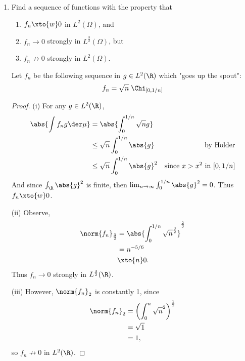 \documentclass[12pt,letterpaper]{article}
\begin{document}
\begin{enumerate}
\begin{proof}
Now considering negative values of $t$; since $f$ is convex, then 
$$f'_-\leq f'_+, $$
and $f'_-$ increases as $t\to 0^-$, so $f(x)+tf'_+(x)\leq f(x)+tf'_-(x)\leq f(x+t)$ for $t<0$, so 
$$f(x)+tf'_+(x)\leq f(x+t)$$
always, and we're done.
\end{proof}

\setcounter{enumi}{22}
\item Find a sequence of functions with the property that 
	\begin{enumerate}
	\item $f_n\xto{w}0$ in $L^2(\Omega)$, and
	\item $f_n\to0$ strongly in $L^\frac{3}{2}(\Omega)$, but 
	\item $f_n\not\to0$ strongly in $L^2(\Omega)$.
	\end{enumerate}
	
	\answer	Let $f_n$ be the following sequence in $g\in L^2(\R)$ which "goes up the spout": 
	$$f_n=\sqrt{n} \;\Chi_{\left[0,{1/n}\right]}$$
	\begin{proof}
	(i) For any $g\in L^2(\R)$, 
	\begin{align*}
	\abs{\int f_ng \der\mu} %
	&=\abs{\int_0^{1/n} \sqrt{n}g } \\
	&\leq \sqrt{n}\int_0^{1/n}\abs{g } & \text{by Holder}\\
	&\leq \sqrt{n}\int_0^{1/n}\abs{g }^2 &\text{since }x>x^2\text{ in }[0,1/n]\\
	\end{align*}
	And since $\int_\R\abs{g}^2$ is finite, then $\lim_{n\to\infty} \int_0^{1/n} \abs{g}^2=0$. 	Thus $f_n\xto{w}0$. \qedwhite

	(ii) Observe, 
	\begin{align*}
	\norm{f_n}_{\frac{3}{2}} &= \abs{\int_0^{1/n} \sqrt{n}^\frac{3}{2} }^{\frac{2}{3}}\\
	&=n^{{-5}/{6}} \\
	&\xto{n}0.
	\end{align*}
	Thus $f_n\to0$ strongly in $L^\frac{3}{2}(\R)$. \qedwhite
	
	\pagebreak
	(iii) However, $\norm{f_n}_2$ is constantly 1, since 
	\begin{align*}
	\norm{f_n}_2 &= \left(\int_0^n \sqrt{n}^2\right)^\frac{1}{2} \\
	&=\sqrt{1} \\
	&=1,
	\end{align*}
	so $f_n\not\to0$ in $L^2(\R)$. 
	\end{proof}

\end{enumerate}
\end{document}
